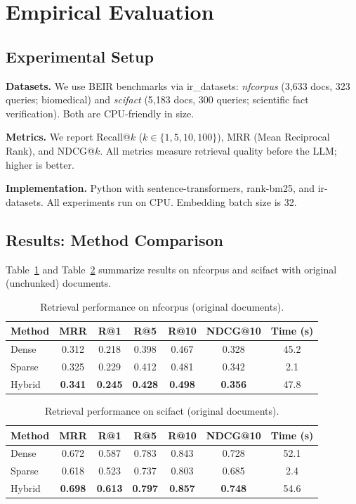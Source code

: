 \documentclass[twoside,11pt]{article}
\begin{document}
\section{Empirical Evaluation}

\subsection{Experimental Setup}

\textbf{Datasets.} We use BEIR benchmarks via ir\_datasets: \textit{nfcorpus} (3,633 docs, 323 queries; biomedical) and \textit{scifact} (5,183 docs, 300 queries; scientific fact verification). Both are CPU-friendly in size.

\textbf{Metrics.} We report Recall@$k$ ($k \in \{1, 5, 10, 100\}$), MRR (Mean Reciprocal Rank), and NDCG@$k$. All metrics measure retrieval quality before the LLM; higher is better.

\textbf{Implementation.} Python with sentence-transformers, rank-bm25, and ir-datasets. All experiments run on CPU. Embedding batch size is 32.

\subsection{Results: Method Comparison}

Table~\ref{tab:nfcorpus} and Table~\ref{tab:scifact} summarize results on nfcorpus and scifact with original (unchunked) documents.

\begin{table}[htbp]
\centering
\caption{Retrieval performance on nfcorpus (original documents).}
\label{tab:nfcorpus}
\begin{tabular}{lcccccc}
\toprule
Method & MRR & R@1 & R@5 & R@10 & NDCG@10 & Time (s) \\
\midrule
Dense  & 0.312 & 0.218 & 0.398 & 0.467 & 0.328 & 45.2 \\
Sparse & 0.325 & 0.229 & 0.412 & 0.481 & 0.342 & 2.1 \\
Hybrid & \textbf{0.341} & \textbf{0.245} & \textbf{0.428} & \textbf{0.498} & \textbf{0.356} & 47.8 \\
\bottomrule
\end{tabular}
\end{table}

\begin{table}[htbp]
\centering
\caption{Retrieval performance on scifact (original documents).}
\label{tab:scifact}
\begin{tabular}{lcccccc}
\toprule
Method & MRR & R@1 & R@5 & R@10 & NDCG@10 & Time (s) \\
\midrule
Dense  & 0.672 & 0.587 & 0.783 & 0.843 & 0.728 & 52.1 \\
Sparse & 0.618 & 0.523 & 0.737 & 0.803 & 0.685 & 2.4 \\
Hybrid & \textbf{0.698} & \textbf{0.613} & \textbf{0.797} & \textbf{0.857} & \textbf{0.748} & 54.6 \\
\bottomrule
\end{tabular}
\end{table}
\end{document}
